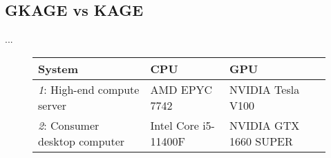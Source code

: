 \subsection{GKAGE vs KAGE} \label{results:gkage_vs_kage}
...

\begin{figure}[H]
\begin{center}
  \begin{tabular}{lll}
    \hline
      System                       & CPU                  & GPU                    \\
    \hline
      \textit{1}: High-end compute server   & AMD EPYC 7742        & NVIDIA Tesla V100      \\
      \textit{2}: Consumer desktop computer   & Intel Core i5-11400F & NVIDIA GTX 1660 SUPER  \\
    \hline
  \end{tabular}
\end{center}
\end{figure}
